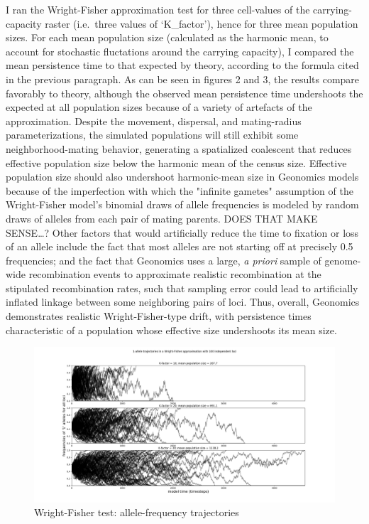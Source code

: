 ﻿\documentclass{article}
\begin{document}
I ran the Wright-Fisher approximation test for three cell-values of the
carrying-capacity raster (i.e.\ three values of `K\_factor'), hence for three mean
population sizes. For each mean population size (calculated as the harmonic mean,
to account for stochastic fluctations around the carrying capacity), I compared
the mean persistence time to that
expected by theory, according to the formula cited in the previous paragraph. As can be
seen in figures 2 and 3, the results compare favorably to theory, although the observed
mean persistence time undershoots the expected at all population sizes because of a variety
of artefacts of the approximation. Despite the movement, dispersal, and mating-radius
parameterizations, the simulated populations will still exhibit some neighborhood-mating
behavior, generating a spatialized coalescent that reduces effective population size
below the harmonic mean of the census size. 
Effective population size should also undershoot harmonic-mean size in
Geonomics models because of the imperfection with which the "infinite gametes" assumption
of the Wright-Fisher model's binomial draws of allele frequencies is modeled by
random draws of alleles from each pair of mating parents. DOES THAT MAKE SENSE\ldots? Other
factors that would artificially reduce the time to fixation or loss of an allele include
the fact that most alleles are not starting off at precisely 0.5 frequencies; and the fact
that Geonomics uses a large, \emph{a priori} sample of genome-wide recombination events
to approximate realistic recombination at the stipulated recombination rates, such that
sampling error could lead to artificially inflated linkage between some neighboring pairs
of loci. Thus, overall, Geonomics demonstrates realistic Wright-Fisher-type drift, with
persistence times characteristic of a population whose effective size undershoots its
mean size.

\begin{figure}[h!]
\includegraphics[width=175mm]{./img/validation/wf/allele_trajectories.png}
        \caption{Wright-Fisher test: allele-frequency trajectories}
\end{figure}
\end{document}
